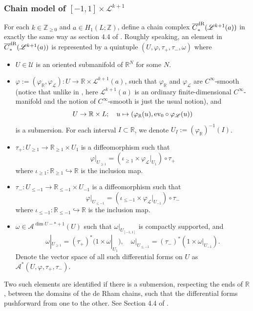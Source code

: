 \documentclass[10pt]{amsart}
\numberwithin{equation}{section}
\theoremstyle{plain}
\theoremstyle{definition}
\theoremstyle{remark}
\numberwithin{equation}{section}
\newcommand{\R}{\mathbb{R}}
\newcommand{\Z}{\mathbb{Z}}
\newcommand{\ev}{\textup{ev}}
\newcommand{\ol}[1]{\overline{#1}}
\newcommand{\ms}[1]{\mathscr{#1}}
\newcommand{\dR}{\textup{dR}}
\begin{document}
{\subsubsection{Chain model of \texorpdfstring{$[-1,1] \times \mathscr{L}^{k+1}$}{[-1,1] x ^{k+1}}}
For each $k\in\Z_{\geq 0}$ and $a\in H_1(L;\Z)$, define a chain complex $\ol{C}_*^\dR(\mathscr{L}^{k+1}(a))$ in exactly the same way as section 4.4 of \cite{Irie2}. 
Roughly speaking, an element in $\ol{C}_*^\dR(\mathscr{L}^{k+1}(a))$ is represented by a quintuple $(U,\varphi,\tau_+,\tau_-,\omega)$ where 
\begin{itemize}
	\item $U\in \mathscr{U}$ is an oriented submanifold of $\R^N$ for some $N$.
	\item $\varphi:=(\varphi_\R,\varphi_\mathscr{L})\colon U\to \R\times \mathscr{L}^{k+1}(a)$, such that $\varphi_\R$ and $\varphi_{\mathscr{L}}$ are $C^\infty$-smooth (notice that unlike in \cite{Irie2}, here $\mathscr{L}^{k+1}(a)$ is an ordinary finite-dimensional $C^\infty$-manifold and the notion of $C^\infty$-smooth is just the usual notion), and \[ U\to \R\times L;\quad u\mapsto (\varphi_\R(u), \ev_0\circ \varphi_\mathscr{L}(u))\] is a submersion. For each interval $I\subset \R$, we denote $U_I:= (\varphi_\R)^{-1}(I)$. 
	\item $\tau_+\colon U_{\geq 1}\to \R_{\geq 1}\times U_1$ is a diffeomorphism such that \[ \varphi|_{U_{\geq 1}} = (\iota_{\geq 1} \times \varphi_{\mathscr{L}}|_{U_1}) \circ \tau_+ \]where $\iota_{\geq 1}\colon \R_{\geq 1}\hookrightarrow \R$ is the inclusion map.
	\item $\tau_-\colon U_{\leq -1}\to \R_{\leq -1}\times U_{-1}$ is a diffeomorphism such that \[ \varphi|_{U_{\leq -1}} = (\iota_{\leq -1} \times \varphi_{\mathscr{L}}|_{U_{-1}}) \circ \tau_- \]where $\iota_{\leq -1}\colon \R_{\leq -1}\hookrightarrow \R$ is the inclusion map.
	\item $\omega\in \mathscr{A}^{\dim U -*+1}(U)$ such that $\omega|_{U_{[-1,1]}}$ is compactly supported, and \[ \omega|_{U_{\geq 1}} = (\tau_+)^*(1\times \omega|_{U_1}),\quad \omega|_{U_{\leq -1}} = (\tau_-)^*(1\times \omega|_{U_{-1}}). \]
	Denote the vector space of all such differential forms on $U$ as $\ms{A}^*(U,\varphi,\tau_+,\tau_-).$
\end{itemize}
Two such elements are identified if there is a submersion, respecting the ends of $\R$, between the domains of the de Rham chains, such that the differential forms pushforward from one to the other. See Section 4.4 of \cite{Irie2}.

}
\end{document}
